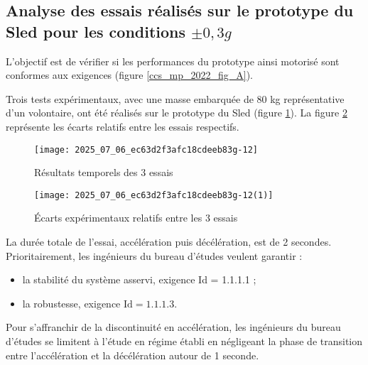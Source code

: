 \subsection{Analyse des essais réalisés sur le prototype du Sled pour les conditions $\pm 0,3 g$}

\begin{obj}
L'objectif est de vérifier si les performances du prototype ainsi motorisé sont conformes aux exigences (figure \ref{ccs_mp_2022_fig_A}).
\end{obj}
\ifprof
\else


Trois tests expérimentaux, avec une masse embarquée de 80 kg représentative d'un volontaire, ont été réalisés sur le prototype du Sled (figure \ref{ccs_mp_2022_fig_16}). La figure \ref{ccs_mp_2022_fig_17} représente les écarts relatifs entre les essais respectifs.\\


\begin{figure}[!h]
\centering
\texttt{[image: 2025\_07\_06\_ec63d2f3afc18cdeeb83g-12]}
\caption{\label{ccs_mp_2022_fig_16}Résultats temporels des 3 essais}
\end{figure}


\begin{figure}[!h]
\centering\texttt{[image: 2025\_07\_06\_ec63d2f3afc18cdeeb83g-12(1)]}
\caption{\label{ccs_mp_2022_fig_17}Écarts expérimentaux relatifs entre les 3 essais}
\end{figure}



La durée totale de l'essai, accélération puis décélération, est de 2 secondes.\\
Prioritairement, les ingénieurs du bureau d'études veulent garantir :

\begin{itemize}
  \item la stabilité du système asservi, exigence Id = 1.1.1.1 ;
  \item la robustesse, exigence $\mathrm{Id}=1.1 .1 .3$.
\end{itemize}

Pour s'affranchir de la discontinuité en accélération, les ingénieurs du bureau d'études se limitent à l'étude en régime établi en négligeant la phase de transition entre l'accélération et la décélération autour de 1 seconde.
\fi

